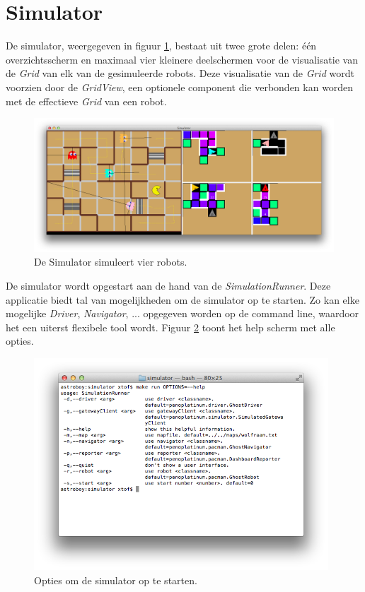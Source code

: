 \documentclass[12pt,a4paper]{report}
\begin{document}
\section{Simulator}

De simulator, weergegeven in figuur \ref{fig:simulator2}, bestaat uit twee grote delen: \'e\'en overzichtsscherm en maximaal vier kleinere deelschermen voor de visualisatie van de \emph{Grid} van elk van de gesimuleerde robots. Deze visualisatie van de \emph{Grid} wordt voorzien door de \emph{GridView}, een optionele component die verbonden kan worden met de effectieve \emph{Grid} van een robot.

\begin{figure}[htbp]
  \centering
  \includegraphics[width=150mm]{resources/simulator2.png}
  \caption{De Simulator simuleert vier robots.}
  \label{fig:simulator2}
\end{figure}

De simulator wordt opgestart aan de hand van de \emph{SimulationRunner}. Deze applicatie biedt tal van mogelijkheden om de simulator op te starten. Zo kan elke mogelijke \emph{Driver}, \emph{Navigator}, ... opgegeven worden op de command line, waardoor het een uiterst flexibele tool wordt. Figuur \ref{fig:simulationrunner} toont het help scherm met alle opties.

\begin{figure}[htbp]
  \centering
  \includegraphics[width=110mm]{resources/simulationrunner.png}
  \caption{Opties om de simulator op te starten.}
  \label{fig:simulationrunner}
\end{figure}
\end{document}
